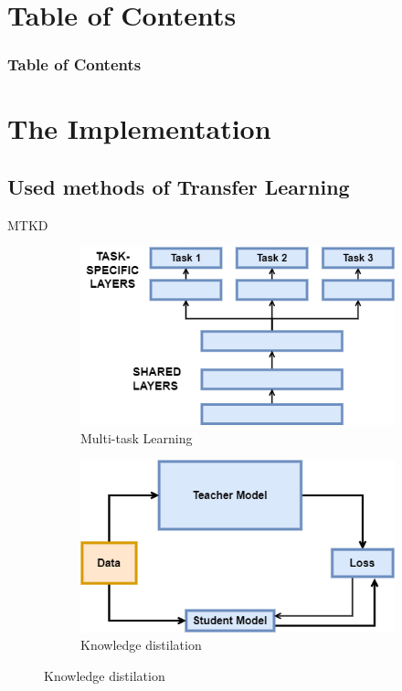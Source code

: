 \documentclass [xcolor=svgnames, t] {beamer}
\begin{document}
\section{Table of Contents}
\begin{frame}
\frametitle{Table of Contents}
\tableofcontents
\end{frame}


\section{The Implementation}
\subsection{Used methods of Transfer Learning}
\begin{frame}{MTKD}
    \centering
\begin{figure}
\centering
\begin{minipage}{.5\textwidth}
  \centering
  \vspace{10mm}
  \begin{figure}[H]
  \includegraphics[width=.9\linewidth]{MTL scheme.png}
  \caption{Multi-task Learning}
  \end{figure}
\end{minipage}%
\begin{minipage}{.5\textwidth}
  \centering
  \vspace{10mm}
  \begin{figure}[H]
  \includegraphics[width=\linewidth]{KD scheme.png}
  \caption{Knowledge distilation}
  \end{figure}
\end{minipage}
\end{figure}
\end{frame}
\end{document}
